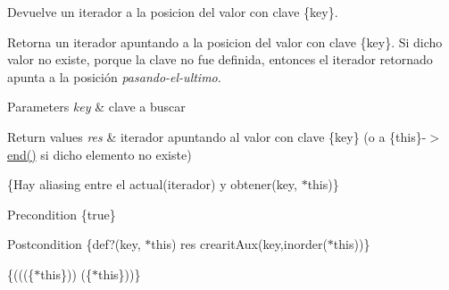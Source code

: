 \-Devuelve un iterador a la posicion del valor con clave \{key\}. 

\-Retorna un iterador apuntando a la posicion del valor con clave \{key\}. \-Si dicho valor no existe, porque la clave no fue definida, entonces el iterador retornado apunta a la posición {\itshape pasando-\/el-\/ultimo\/}.


\begin{DoxyParams}{\-Parameters}
{\em key} & clave a buscar \\
\hline
\end{DoxyParams}

\begin{DoxyRetVals}{\-Return values}
{\em res} & iterador apuntando al valor con clave \{key\} (o a \{this\}-\/$>$\hyperlink{classaed2_1_1map_a76023e6a56cb625513e1b5ea028bf983}{end()} si dicho elemento no existe)\\
\hline
\end{DoxyRetVals}
\{\-Hay aliasing entre el actual(iterador) y obtener(key, $\ast$this)\}

\begin{DoxyPrecond}{\-Precondition}
\{true\} 
\end{DoxyPrecond}
\begin{DoxyPostcond}{\-Postcondition}
\{def?(key, $\ast$this)  res  crearit\-Aux(key,inorder($\ast$this))\}
\end{DoxyPostcond}
\{(((\{$\ast$this\}))  (\{$\ast$this\}))\}

